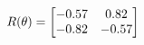 \documentclass[preview]{standalone}
\begin{document}
\begin{align*}
\special{dvisvgm:raw <g id='unique000'>}R(\theta) = \begin{bmatrix}-0.57 & 0.82\\-0.82 & -0.57\end{bmatrix}\special{dvisvgm:raw </g>}
\end{align*}
\end{document}
